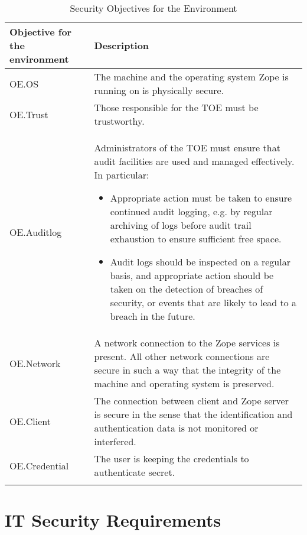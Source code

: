 \documentclass[12pt,english]{scrbook}
\begin{document}
\begin{longtable}[c]{lp{10cm}}
  \toprule
   Objective for the environment & Description \\
  
  \midrule\endhead

  OE.OS
   & 
  The machine and the operating system Zope is running
  on is physically secure.
   \\

  OE.Trust
   & 
  Those responsible for the TOE must be trustworthy.
   \\

  OE.Auditlog
   & 
  Administrators of the TOE must ensure that audit
  facilities are used and managed effectively. In
  particular:

  \begin{itemize}

    \item Appropriate action must be taken to ensure continued audit logging,
    e.g. by regular archiving of logs before audit trail exhaustion to ensure
    sufficient free space.

    \item Audit logs should be inspected on a regular basis, and appropriate
    action should be taken on the detection of breaches of security, or events
    that are likely to lead to a breach in the future.

  \end{itemize}
   \\

  OE.Network
   & 
  A network connection to the Zope services is present.
  All other network connections are secure in such a
  way that the integrity of the machine and operating
  system is preserved.
   \\

  OE.Client
   & 
  The connection between client and Zope server is secure
  in the sense that the identification and authentication
  data is not monitored or interfered.
   \\

  OE.Credential
   & 
  The user is keeping the credentials to authenticate
  secret.
  \\
  \bottomrule
  \caption{Security Objectives for the Environment}
\end{longtable}





\chapter{IT Security Requirements}
\end{document}
